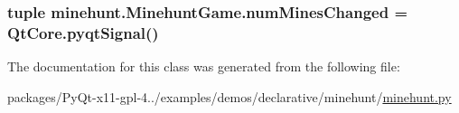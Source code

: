 \subsubsection[{num\+Mines\+Changed}]{\setlength{\rightskip}{0pt plus 5cm}tuple minehunt.\+Minehunt\+Game.\+num\+Mines\+Changed = Qt\+Core.\+pyqt\+Signal()\hspace{0.3cm}{\ttfamily [static]}}\label{classminehunt_1_1MinehuntGame_abb8b1801f6caac883a82a75aa44a2158}


The documentation for this class was generated from the following file\+:\begin{DoxyCompactItemize}
\item 
packages/\+Py\+Qt-\/x11-\/gpl-\/4../examples/demos/declarative/minehunt/\hyperlink{minehunt_8py}{minehunt.\+py}\end{DoxyCompactItemize}
